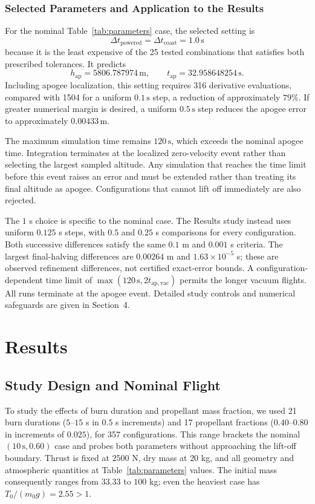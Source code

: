 \documentclass{article}
\begin{document}
\subsubsection{Selected Parameters and Application to the Results}

For the nominal Table~\ref{tab:parameters} case, the selected setting is
\[
\boxed{
\Delta t_{\mathrm{powered}}
=
\Delta t_{\mathrm{coast}}
=
1.0\,\mathrm{s}
}
\]
because it is the least expensive of the 25 tested combinations
that satisfies both prescribed tolerances. It predicts
\[
h_{\mathrm{ap}}=5806.787974\,\mathrm{m},
\qquad
t_{\mathrm{ap}}=32.958648254\,\mathrm{s}.
\]
Including apogee localization, this setting requires 316 derivative
evaluations, compared with 1504 for a uniform $0.1\,\mathrm{s}$
step, a reduction of approximately $79\%$. If greater numerical
margin is desired, a uniform $0.5\,\mathrm{s}$ step reduces the
apogee error to approximately $0.00433\,\mathrm{m}$.

The maximum simulation time remains $120\,\mathrm{s}$, which exceeds
the nominal apogee time. Integration terminates at the localized
zero-velocity event rather than selecting the largest sampled
altitude. Any simulation that reaches the time limit before this
event raises an error and must be extended rather than treating its final altitude
as apogee. Configurations that cannot lift off immediately are also rejected.

The $1$ s choice is specific to the nominal case. The Results study instead uses uniform $0.125$ s steps, with $0.5$ and $0.25$ s comparisons for every configuration. Both successive differences satisfy the same $0.1$ m and $0.001$ s criteria. The largest final-halving differences are $0.00264$ m and $1.63\times10^{-5}$ s; these are observed refinement differences, not certified exact-error bounds. A configuration-dependent time limit of $\max(120\,\mathrm{s},2t_{\mathrm{ap,vac}})$ permits the longer vacuum flights. All runs terminate at the apogee event. Detailed study controls and numerical safeguards are given in Section~4.

\section{Results}
\subsection{Study Design and Nominal Flight}
To study the effects of burn duration and propellant mass fraction, we used 21 burn durations ($5$--$15$ s in $0.5$ s increments) and 17 propellant fractions ($0.40$--$0.80$ in increments of $0.025$), for 357 configurations. This range brackets the nominal $(10\,\mathrm{s},0.60)$ case and probes both parameters without approaching the lift-off boundary. Thrust is fixed at $2500$ N, dry mass at $20$ kg, and all geometry and atmospheric quantities at Table~\ref{tab:parameters} values. The initial mass consequently ranges from $33.33$ to $100$ kg; even the heaviest case has $T_0/(m_0g)=2.55>1$.
\end{document}
